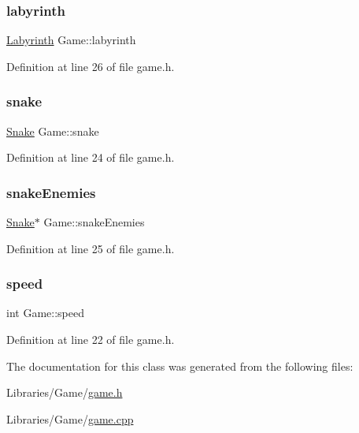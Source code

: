 \subsubsection{\texorpdfstring{labyrinth}{labyrinth}}
{\footnotesize\ttfamily \mbox{\hyperlink{class_labyrinth}{Labyrinth}} Game\+::labyrinth\hspace{0.3cm}{\ttfamily [private]}}



Definition at line 26 of file game.\+h.

\mbox{\label{class_game_ab77bfcc312425811000819791ea7668e}} 
\subsubsection{\texorpdfstring{snake}{snake}}
{\footnotesize\ttfamily \mbox{\hyperlink{class_snake}{Snake}} Game\+::snake\hspace{0.3cm}{\ttfamily [private]}}



Definition at line 24 of file game.\+h.

\mbox{\label{class_game_ab7d2baa4a2dbcb64fc1611aac709fe40}} 
\subsubsection{\texorpdfstring{snakeEnemies}{snakeEnemies}}
{\footnotesize\ttfamily \mbox{\hyperlink{class_snake}{Snake}}$\ast$ Game\+::snake\+Enemies\hspace{0.3cm}{\ttfamily [private]}}



Definition at line 25 of file game.\+h.

\mbox{\label{class_game_a02a58acc040d6d014e02832453695ef5}} 
\subsubsection{\texorpdfstring{speed}{speed}}
{\footnotesize\ttfamily int Game\+::speed\hspace{0.3cm}{\ttfamily [private]}}



Definition at line 22 of file game.\+h.



The documentation for this class was generated from the following files\+:\begin{DoxyCompactItemize}
\item 
Libraries/\+Game/\mbox{\hyperlink{game_8h}{game.\+h}}\item 
Libraries/\+Game/\mbox{\hyperlink{game_8cpp}{game.\+cpp}}\end{DoxyCompactItemize}
